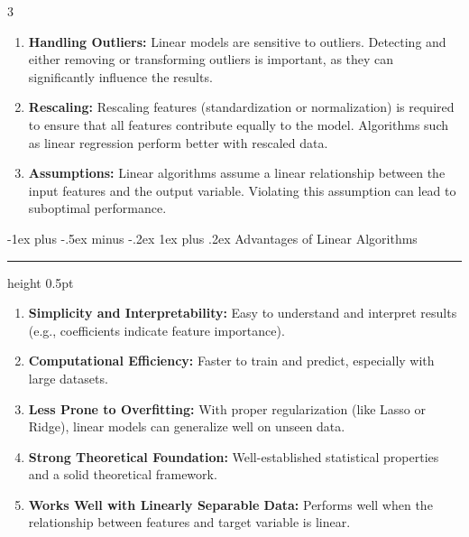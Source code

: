 \documentclass[letterpaper, 10.5pt,landscape]{article}
\makeatletter
\renewcommand{\subsubsection}{\@startsection{subsubsection}{3}{0mm}%
                                {-1ex plus -.5ex minus -.2ex}%
                                {1ex plus .2ex}%
                                {\normalfont\small\bfseries}}
\makeatother
\begin{document}
\begin{multicols*}{3}
\begin{enumerate}
    \item \textbf{Handling Outliers:} 
    Linear models are sensitive to outliers. Detecting and either removing or transforming outliers is important, as they can significantly influence the results.

    \item \textbf{Rescaling:} 
    Rescaling features (standardization or normalization) is required to ensure that all features contribute equally to the model. Algorithms such as linear regression perform better with rescaled data.

    \item \textbf{Assumptions:} 
    Linear algorithms assume a linear relationship between the input features and the output variable. Violating this assumption can lead to suboptimal performance.
\end{enumerate}


\subsubsection{Advantages of Linear Algorithms} {\color{teal}\hrule height 0.5pt} \smallskip


\begin{enumerate}
    \item \textbf{Simplicity and Interpretability:} 
    Easy to understand and interpret results (e.g., coefficients indicate feature importance).
    
    \item \textbf{Computational Efficiency:} 
    Faster to train and predict, especially with large datasets.
    
    \item \textbf{Less Prone to Overfitting:} 
    With proper regularization (like Lasso or Ridge), linear models can generalize well on unseen data.
    
    \item \textbf{Strong Theoretical Foundation:} 
    Well-established statistical properties and a solid theoretical framework.
    
    \item \textbf{Works Well with Linearly Separable Data:} 
    Performs well when the relationship between features and target variable is linear.
\end{enumerate}
\vspace{5pt}

\vspace*{\fill}


\end{multicols*}
\end{document}
